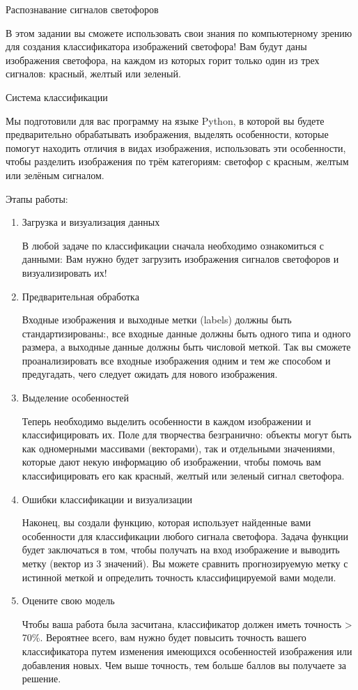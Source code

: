 
Распознавание сигналов светофоров

В этом задании вы сможете использовать свои знания по компьютерному зрению для создания классификатора изображений светофора! Вам будут даны изображения светофора, на каждом из которых горит только один из трех сигналов: красный, желтый или зеленый.

Система классификации

Мы подготовили для вас программу на языке Python, в которой вы будете предварительно обрабатывать изображения, выделять особенности, которые помогут находить отличия в видах изображения, использовать эти особенности, чтобы разделить изображения по трём категориям: светофор с красным, желтым или зелёным сигналом.

Этапы работы:

\begin{enumerate}
    \item Загрузка и визуализация данных

    В любой задаче по классификации сначала необходимо ознакомиться с данными: Вам нужно будет загрузить изображения сигналов светофоров и визуализировать их!

    \item Предварительная обработка

    Входные изображения и выходные метки (labels) должны быть стандартизированы:, все входные данные должны быть одного типа и одного размера, а выходные данные должны быть числовой меткой. Так вы сможете проанализировать все входные изображения одним и тем же способом и предугадать, чего следует ожидать для нового изображения.

    \item Выделение особенностей

    Теперь необходимо выделить особенности в каждом изображении и классифицировать их. Поле для творчества безгранично: объекты могут быть как одномерными массивами (векторами), так и отдельными значениями, которые дают некую информацию об изображении, чтобы помочь вам классифицировать его как красный, желтый или зеленый сигнал светофора. 


    \item Ошибки классификации и визуализации

    Наконец, вы создали функцию, которая использует найденные вами особенности для классификации любого сигнала светофора. Задача функции будет заключаться в том, чтобы получать на вход изображение и выводить метку (вектор из 3 значений). Вы можете сравнить прогнозируемую метку с истинной меткой и определить точность классифицируемой вами модели.

    \item Оцените свою модель

    Чтобы ваша работа была засчитана, классификатор должен иметь точность > 70\%. Вероятнее всего, вам нужно будет повысить точность вашего классификатора путем изменения имеющихся особенностей изображения или добавления новых. Чем выше точность, тем больше баллов вы получаете за решение.
\end{enumerate}

